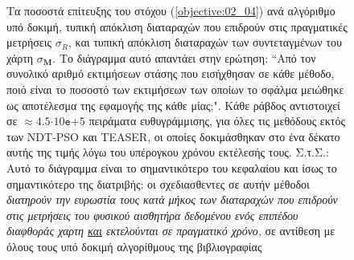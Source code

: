 \begin{figure}[!h]\vspace{1.5cm}\hspace{0.6cm}%
  
  \vspace{0.75cm}
  \caption{\small Τα ποσοστά επίτευξης του στόχου (\ref{objective:02_04}) ανά
           αλγόριθμο υπό δοκιμή, τυπική απόκλιση διαταραχών που επιδρούν στις
           πραγματικές μετρήσεις $\sigma_R$, και τυπική απόκλιση διαταραχών των
           συντεταγμένων του χάρτη $\sigma_{\bm{M}}$. Το διάγραμμα αυτό
           απαντάει στην ερώτηση: ``Από τον συνολικό αριθμό εκτιμήσεων στάσης
           που εισήχθησαν σε κάθε μέθοδο, ποιό είναι το ποσοστό των εκτιμήσεων
           των οποίων το σφάλμα μειώθηκε ως αποτέλεσμα της εφαμογής της κάθε
           μίας;". Κάθε ράβδος αντιστοιχεί σε $\approx
           4.5$$\cdot$$10\texttt{e}$$+$$5$ πειράματα ευθυγράμμισης, για όλες
           τις μεθόδους εκτός των NDT-PSO και TEASER, οι οποίες δοκιμάσθηκαν
           στο ένα δέκατο αυτής της τιμής λόγω του υπέρογκου χρόνου εκτέλεσής
           τους.  Σ.τ.Σ.: Αυτό το διάγραμμα είναι το σημαντικότερο του
           κεφαλαίου και ίσως το σημαντικότερο της διατριβής: οι σχεδιασθεντες
           σε αυτήν μέθοδοι \textit{διατηρούν την ευρωστία τους κατά μήκος των
           διαταραχών που επιδρούν στις μετρήσεις του φυσικού αισθητήρα
           δεδομένου ενός επιπέδου διαφθοράς χαρτη \underline{και} εκτελούνται
           σε πραγματικό χρόνο}, σε αντίθεση με όλους τους υπό δοκιμή
           αλγορίθμους της βιβλιογραφίας}
  \label{fig:02_04_05:01}
\end{figure}

